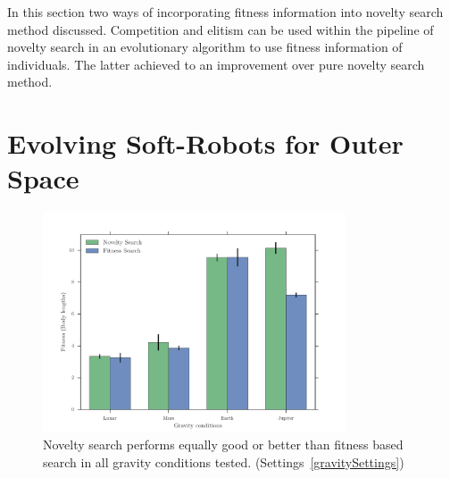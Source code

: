 In this section two ways of incorporating fitness information into novelty search method discussed. Competition and elitism can be used within the pipeline of novelty search in an evolutionary algorithm to use fitness information of individuals. The latter achieved to an improvement over pure novelty search method.















\section{Evolving Soft-Robots for Outer Space}  

\begin{figure}[t!]
\centering
\includegraphics[width=0.8\textwidth]{../Figures/Results/GravityExperiment.pdf}
\caption{Novelty search performs equally good or better than fitness based search in all gravity conditions tested. (Settings~\ref{gravitySettings})}
\label{fig:gravityConditions}
\end{figure}

